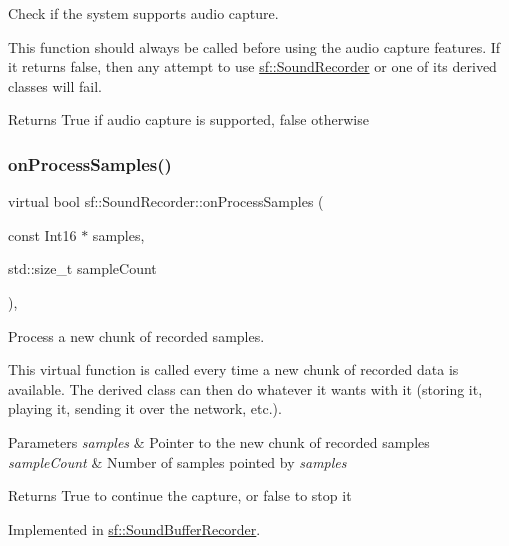 Check if the system supports audio capture. 

This function should always be called before using the audio capture features. If it returns false, then any attempt to use \hyperlink{classsf_1_1_sound_recorder}{sf\+::\+Sound\+Recorder} or one of its derived classes will fail.

\begin{DoxyReturn}{Returns}
True if audio capture is supported, false otherwise 
\end{DoxyReturn}
\mbox{\label{classsf_1_1_sound_recorder_a2670124cbe7a87c7e46b4840807f4fd7}} 
\subsubsection{\texorpdfstring{on\+Process\+Samples()}{onProcessSamples()}}
{\footnotesize\ttfamily virtual bool sf\+::\+Sound\+Recorder\+::on\+Process\+Samples (\begin{DoxyParamCaption}\item[{const Int16 $\ast$}]{samples,  }\item[{std\+::size\+\_\+t}]{sample\+Count }\end{DoxyParamCaption})\hspace{0.3cm}{\ttfamily [protected]}, {}}



Process a new chunk of recorded samples. 

This virtual function is called every time a new chunk of recorded data is available. The derived class can then do whatever it wants with it (storing it, playing it, sending it over the network, etc.).


\begin{DoxyParams}{Parameters}
{\em samples} & Pointer to the new chunk of recorded samples \\
\hline
{\em sample\+Count} & Number of samples pointed by {\itshape samples} \\
\hline
\end{DoxyParams}
\begin{DoxyReturn}{Returns}
True to continue the capture, or false to stop it 
\end{DoxyReturn}


Implemented in \hyperlink{classsf_1_1_sound_buffer_recorder_a9ceb94de14632ae8c1b78faf603b4767}{sf\+::\+Sound\+Buffer\+Recorder}.


